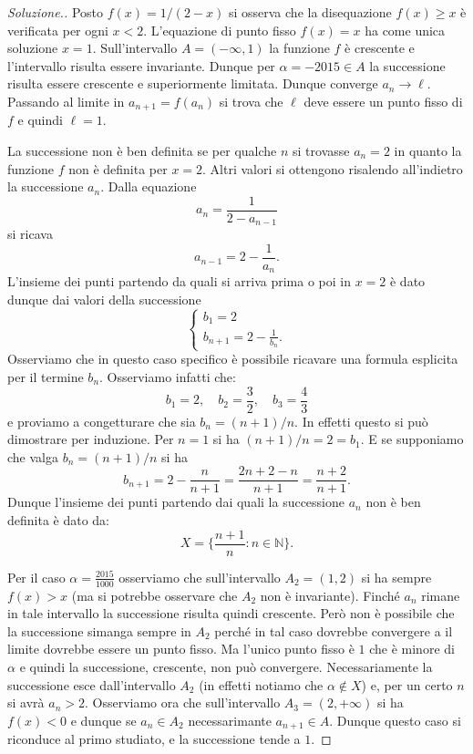 \documentclass[italian,a4paper]{scrartcl}
\newcommand{\NN}{{\mathbb N}}
\begin{document}
\begin{proof}[Soluzione.]
Posto $f(x) = 1/(2-x)$
si osserva che la disequazione $f(x)\ge x$ è verificata per ogni
$x<2$. L'equazione di punto fisso $f(x)=x$ ha come unica soluzione
$x=1$. Sull'intervallo $A=(-\infty,1)$ la funzione $f$ è crescente e
l'intervallo risulta essere invariante. Dunque per
$\alpha=-2015 \in A$ la successione risulta essere crescente e superiormente
limitata. Dunque converge $a_n\to \ell$. Passando al limite in
$a_{n+1} = f(a_n)$ si trova che $\ell$ deve essere un punto fisso di
$f$ e quindi $\ell = 1$.

La successione non è ben definita se per qualche $n$ si trovasse
$a_n=2$ in quanto la funzione $f$ non è definita per $x=2$. Altri
valori si ottengono risalendo all'indietro la successione $a_n$.
Dalla equazione
\[
a_n = \frac{1}{2-a_{n-1}}
\]
si ricava
\[
a_{n-1} = 2-\frac{1}{a_n}.
\]
L'insieme dei punti partendo da quali si arriva prima o poi in $x=2$ è
dato dunque dai valori della successione
\[
\begin{cases}
  b_1 = 2\\
  b_{n+1} = 2 - \frac{1}{b_n}.
\end{cases}
\]
Osserviamo che in questo caso specifico è possibile ricavare una
formula esplicita per il termine $b_n$. Osserviamo infatti che:
\[
b_1 = 2,\quad
b_2 = \frac{3}{2},\quad
b_3 = \frac{4}{3}
\]
e proviamo a congetturare che sia $b_n = (n+1) / n$. In effetti questo
si può dimostrare per induzione. Per $n=1$ si ha $(n+1)/n = 2 =
b_1$. E se supponiamo che valga $b_n = (n+1)/n$ si ha
\[
b_{n+1} = 2 - \frac{n}{n+1} = \frac{2n+2-n}{n+1} = \frac{n+2}{n+1}.
\]
Dunque l'insieme dei punti partendo dai quali la successione $a_n$ non
è ben definita è dato da:
\[
  X= \{\frac{n+1}{n}\colon n \in \NN\}.
\]

Per il caso $\alpha=\frac{2015}{1000}$ osserviamo che sull'intervallo
$A_2 = (1,2)$ si ha sempre $f(x)>x$ (ma si potrebbe osservare che
$A_2$ non è invariante). Finché $a_n$ rimane in
tale intervallo la successione risulta quindi crescente. Però non è
possibile che la successione simanga sempre in $A_2$ perché in tal
caso dovrebbe convergere a il limite dovrebbe essere un punto
fisso. Ma l'unico punto fisso è $1$ che è minore di $\alpha$ e quindi
la successione, crescente, non può convergere. Necessariamente la
successione esce dall'intervallo $A_2$ (in effetti notiamo che $\alpha
\not \in X$) e, per un certo $n$ si avrà $a_n>2$. Osserviamo ora che
sull'intervallo $A_3 = (2,+\infty)$ si ha $f(x)<0$ e dunque
se $a_n\in A_2$ necessarimante $a_{n+1} \in A$. Dunque questo caso si
riconduce al primo studiato, e la successione tende a $1$.
\end{proof}
\end{document}
